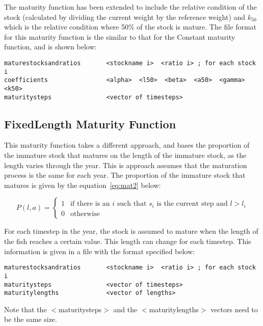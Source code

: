 \documentclass[10pt,twoside]{book}
\begin{document}
The maturity function has been extended to include the relative condition of the stock (calculated by dividing the current weight by the reference weight) and $k_{50}$ which is the relative condition where 50\% of the stock is mature.  The file format for this maturity function is the similar to that for the Constant maturity function, and is shown below:

{\small\begin{verbatim}
maturestocksandratios       <stockname i>  <ratio i> ; for each stock i
coefficients                <alpha>  <l50>  <beta>  <a50>  <gamma>  <k50>
maturitysteps               <vector of timesteps>
\end{verbatim}}

\subsection{FixedLength Maturity Function}
This maturity function takes a different approach, and bases the proportion of the immature stock that matures on the length of the immature stock, as the length varies through the year.  This is approach assumes that the maturation process is the same for each year.  The proportion of the immature stock that matures is given by the equation~\ref{eq:mat2} below:

\begin{equation}\label{eq:mat2}
P(l, a) =
\begin{cases}
1 & \textrm{if there is an $i$ such that $s_i$ is the current step and $l > l_i$} \\
0 & \textrm{otherwise}
\end{cases}
\end{equation}

For each timestep in the year, the stock is assumed to mature when the length of the fish reaches a certain value.  This length can change for each timestep.  This information is given in a file with the format specified below:

{\small\begin{verbatim}
maturestocksandratios       <stockname i>  <ratio i> ; for each stock i
maturitysteps               <vector of timesteps>
maturitylengths             <vector of lengths>
\end{verbatim}}

Note that the $<$maturitysteps$>$ and the $<$maturitylengths$>$ vectors need to be the same size.
\end{document}
